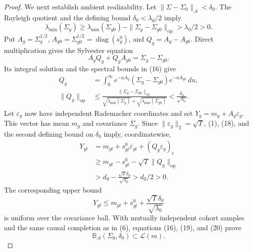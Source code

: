 \documentclass{article}
\begin{document}
\begin{proof}
We next establish ambient realizability.  Let
\(\|\Sigma-\Sigma_0\|_{\mathcal A}<\delta_0\).  The Rayleigh quotient and the defining bound \(\delta_0<\lambda_0/2\) imply
\[
\lambda_{\min}(\Sigma_g)
\ge\lambda_{\min}(\Sigma_{g0})
-\|\Sigma_g-\Sigma_{g0}\|_{\mathrm{op}}
>\lambda_0/2>0.                                                         \tag{16}
\]
Put \(A_g=\Sigma_g^{1/2}\), \(A_{g0}=\Sigma_{g0}^{1/2}=\operatorname{diag}(s_g^0)\), and \(Q_g=A_g-A_{g0}\).  Direct multiplication gives the Sylvester equation
\[
A_gQ_g+Q_gA_{g0}=\Sigma_g-\Sigma_{g0}.                                  \tag{17}
\]
Its integral solution and the spectral bounds in (16) give
\[
\begin{aligned}
Q_g
&=\int_0^\infty e^{-uA_g}(\Sigma_g-\Sigma_{g0})e^{-uA_{g0}}\,du,\\
\|Q_g\|_{\mathrm{op}}
&\le
\frac{\|\Sigma_g-\Sigma_{g0}\|_{\mathrm{op}}}
{\sqrt{\lambda_{\min}(\Sigma_g)}+
 \sqrt{\lambda_{\min}(\Sigma_{g0})}}
<\frac{\delta_0}{\sqrt{\lambda_0}}.                                  \tag{18}
\end{aligned}
\]
Let \(\varepsilon_g\) now have independent Rademacher coordinates and set
\(Y_g=m_g+A_g\varepsilon_g\).  This vector has mean \(m_g\) and covariance \(\Sigma_g\).  Since \(\|\varepsilon_g\|_2=\sqrt T\), (1), (18), and the second defining bound on \(\delta_0\) imply, coordinatewise,
\[
\begin{aligned}
Y_{gt}
&=m_{gt}+s^0_{gt}\varepsilon_{gt}+(Q_g\varepsilon_g)_t\\
&\ge m_{gt}-s^0_{gt}-\sqrt T\|Q_g\|_{\mathrm{op}}\\
&>d_0-\frac{\sqrt T\delta_0}{\sqrt{\lambda_0}}
>d_0/2>0.                                                               \tag{19}
\end{aligned}
\]
The corresponding upper bound
\[
Y_{gt}\le m_{gt}+s^0_{gt}
+\frac{\sqrt T\delta_0}{\sqrt{\lambda_0}}                             \tag{20}
\]
is uniform over the covariance ball.  With mutually independent cohort samples and the same causal completion as in (6), equations (16), (19), and (20) prove
\[
\mathbb B_{\mathcal A}(\Sigma_0,\delta_0)\subset\mathcal L(m).         \tag{21}
\]


\end{proof}
\end{document}
